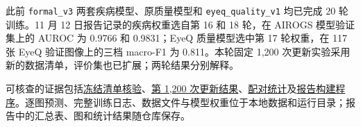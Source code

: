 \documentclass[
  10pt,
]{article}
\begin{document}
此前 \texttt{formal\_v3} 两套疾病模型、原质量模型和
\texttt{eyeq\_quality\_v1} 均已完成 20 轮训练。11 月 12
日报告记录的疾病权重选自第 16 和 18 轮，在 AIROGS 模型验证集上的 AUROC
为 0.9766 和 0.9831；EyeQ 质量模型选中第 17 轮权重，在 117 张 EyeQ
验证图像上的三档 macro-F1 为 0.811。本轮固定 1,200
次更新实验采用新的数据清单，评价集也已扩展；两轮结果分别解释。

可核查的证据包括\href{../../../data/prepared/expanded_20261113/cohort_verification.json}{冻结清单核验}、\href{../../../runs/expanded_20261113/budget_end_comparison.json}{第
1,200
次更新结果}、\href{experimental-analysis/analysis.json}{配对统计}及\href{../../../tools/build_progress_overview_20261113.py}{报告构建程序}。逐图预测、完整训练日志、数据文件与模型权重位于本地数据和运行目录；报告中的汇总表、图和统计结果随仓库保存。
\end{document}
